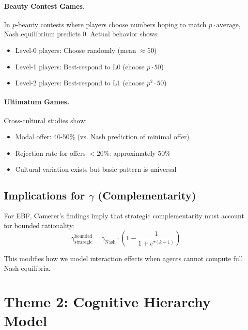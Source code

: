 \paragraph{Beauty Contest Games.} In $p$-beauty contests where players choose numbers hoping to match $p \cdot \text{average}$, Nash equilibrium predicts 0. Actual behavior shows:
\begin{itemize}[nosep]
\item Level-0 players: Choose randomly (mean $\approx 50$)
\item Level-1 players: Best-respond to L0 (choose $p \cdot 50$)
\item Level-2 players: Best-respond to L1 (choose $p^2 \cdot 50$)
\end{itemize}

\paragraph{Ultimatum Games.} Cross-cultural studies \citep{camerer2015ultimatum} show:
\begin{itemize}[nosep]
\item Modal offer: 40-50\% (vs. Nash prediction of minimal offer)
\item Rejection rate for offers $< 20\%$: approximately 50\%
\item Cultural variation exists but basic pattern is universal
\end{itemize}

\subsection{Implications for $\gamma$ (Complementarity)}

For EBF, Camerer's findings imply that strategic complementarity must account for bounded rationality:
\begin{equation}
\gamma_{\text{strategic}}^{\text{bounded}} = \gamma_{\text{Nash}} \cdot \left(1 - \frac{1}{1 + e^{\tau(k-1)}}\right)
\end{equation}

This modifies how we model interaction effects when agents cannot compute full Nash equilibria.


\section{Theme 2: Cognitive Hierarchy Model}
\label{sec:ca-cognitive}

